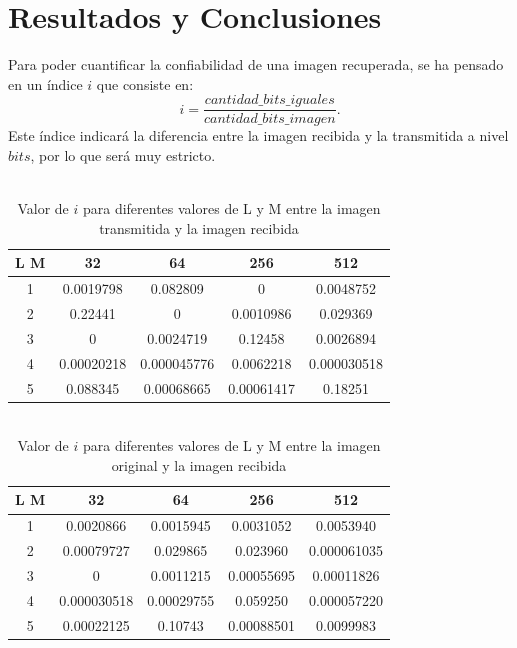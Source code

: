 \documentclass[10pt,journal,compsoc]{IEEEtran}
\begin{document}
\section{Resultados y Conclusiones}

Para poder cuantificar la confiabilidad de una imagen recuperada, se ha pensado en un \'indice $i$ que consiste en: 
\begin{equation}
 i=\frac{cantidad\_bits\_iguales}{cantidad\_bits\_imagen}   .
\nonumber
\end{equation}
Este \'indice indicar\'a la diferencia entre la imagen recibida y la transmitida a nivel $bits$, por lo que ser\'a muy estricto.




\begin{table}[ht]
\caption{\\Valor de $i$ para diferentes valores de L y M entre la imagen transmitida y la imagen recibida} 
\centering  
\begin{tabular}{c | c | c | c | c}  
\hline\hline
L   M & 32 & 64 & 256 & 512 \\ \hline 
1 & 0.0019798 & 0.082809 & 0 & 0.0048752 \\  
2 & 0.22441 & 0 & 0.0010986  & 0.029369 \\ 
3 & 0 &  0.0024719 & 0.12458 & 0.0026894\\ 
4 & 0.00020218& 0.000045776 & 0.0062218 & 0.000030518 \\ 
5 & 0.088345 &  0.00068665 & 0.00061417 & 0.18251  \\ [1ex]  
\hline 
\end{tabular} 
\label{table:nonlin}  
\end{table} 



\begin{table}[ht] 
\caption{\\Valor de $i$ para diferentes valores de L y M entre la imagen original y la imagen recibida}
\centering  
\begin{tabular}{c | c | c | c | c}  
\hline\hline
L   M & 32 & 64 & 256 & 512 \\ \hline 
1 & 0.0020866 & 0.0015945 & 0.0031052 & 0.0053940 \\  
2 & 0.00079727 & 0.029865 & 0.023960  & 0.000061035 \\ 
3 & 0 & 0.0011215 & 0.00055695 & 0.00011826\\ 
4 & 0.000030518 & 0.00029755 & 0.059250 & 0.000057220 \\ 
5 & 0.00022125 & 0.10743 & 0.00088501 & 0.0099983  \\ [1ex]  
\hline 
\end{tabular} 
\label{table:nonlin}  
\end{table} 
\end{document}
